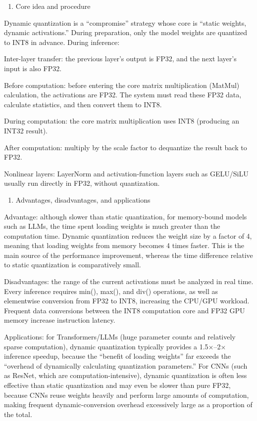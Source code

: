 \begin{enumerate}
\def\labelenumi{(\arabic{enumi})}
\tightlist
\item
  Core idea and procedure
\end{enumerate}

Dynamic quantization is a ``compromise'' strategy whose core is ``static weights, dynamic activations.'' During preparation, only the model weights are quantized to INT8 in advance. During inference:

Inter-layer transfer: the previous layer's output is FP32, and the next layer's input is also FP32.

Before computation: before entering the core matrix multiplication (MatMul) calculation, the activations are FP32. The system must read these FP32 data, calculate statistics, and then convert them to INT8.

During computation: the core matrix multiplication uses INT8 (producing an INT32 result).

After computation: multiply by the scale factor to dequantize the result back to FP32.

Nonlinear layers: LayerNorm and activation-function layers such as GELU/SiLU usually run directly in FP32, without quantization.

\begin{enumerate}
\def\labelenumi{(\arabic{enumi})}
\setcounter{enumi}{1}
\tightlist
\item
  Advantages, disadvantages, and applications
\end{enumerate}

Advantage: although slower than static quantization, for memory-bound models such as LLMs, the time spent loading weights is much greater than the computation time. Dynamic quantization reduces the weight size by a factor of 4, meaning that loading weights from memory becomes 4 times faster. This is the main source of the performance improvement, whereas the time difference relative to static quantization is comparatively small.

Disadvantages: the range of the current activations must be analyzed in real time. Every inference requires min(), max(), and div() operations, as well as elementwise conversion from FP32 to INT8, increasing the CPU/GPU workload. Frequent data conversions between the INT8 computation core and FP32 GPU memory increase instruction latency.

Applications: for Transformers/LLMs (huge parameter counts and relatively sparse computation), dynamic quantization typically provides a 1.5×--2× inference speedup, because the ``benefit of loading weights'' far exceeds the ``overhead of dynamically calculating quantization parameters.'' For CNNs (such as ResNet, which are computation-intensive), dynamic quantization is often less effective than static quantization and may even be slower than pure FP32, because CNNs reuse weights heavily and perform large amounts of computation, making frequent dynamic-conversion overhead excessively large as a proportion of the total.

